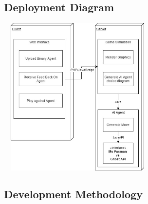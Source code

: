 \documentclass[11pt]{article}
\begin{document}
\subsection{Deployment Diagram}
\begin{center}
 \includegraphics[width=8cm, height=8cm]{Images/RetroRabbit_Deployment_Diagram.jpg}\\[1cm]
\end{center}
       

\subsection{Development Methodology}
\end{document}
